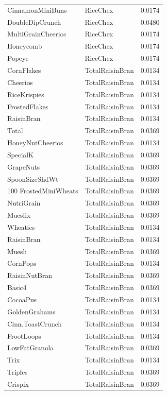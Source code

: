 \begin{longtable}{llr}
CinnamonMiniBuns & RiceChex & 0.0174 \\
DoubleDipCrunch & RiceChex & 0.0480 \\
MultiGrainCheerios & RiceChex & 0.0174 \\
Honeycomb & RiceChex & 0.0174 \\
Popeye & RiceChex & 0.0174 \\
CornFlakes & TotalRaisinBran & 0.0134 \\
Cheerios & TotalRaisinBran & 0.0134 \\
RiceKrispies & TotalRaisinBran & 0.0134 \\
FrostedFlakes & TotalRaisinBran & 0.0134 \\
RaisinBran & TotalRaisinBran & 0.0134 \\
Total & TotalRaisinBran & 0.0369 \\
HoneyNutCheerios & TotalRaisinBran & 0.0134 \\
SpecialK & TotalRaisinBran & 0.0369 \\
GrapeNuts & TotalRaisinBran & 0.0369 \\
SpoonSizeShdWt & TotalRaisinBran & 0.0369 \\
100%
FrostedMiniWheats & TotalRaisinBran & 0.0369 \\
NutriGrain & TotalRaisinBran & 0.0369 \\
Mueslix & TotalRaisinBran & 0.0369 \\
Wheaties & TotalRaisinBran & 0.0134 \\
RaisinBran & TotalRaisinBran & 0.0134 \\
Muesli & TotalRaisinBran & 0.0369 \\
CornPops & TotalRaisinBran & 0.0134 \\
RaisinNutBran & TotalRaisinBran & 0.0369 \\
Basic4 & TotalRaisinBran & 0.0369 \\
CocoaPus & TotalRaisinBran & 0.0134 \\
GoldenGrahams & TotalRaisinBran & 0.0134 \\
Cinn.ToastCrunch & TotalRaisinBran & 0.0134 \\
FrootLoops & TotalRaisinBran & 0.0134 \\
LowFatGranola & TotalRaisinBran & 0.0369 \\
Trix & TotalRaisinBran & 0.0134 \\
Triples & TotalRaisinBran & 0.0369 \\
Crispix & TotalRaisinBran & 0.0369 \\

\end{longtable}
